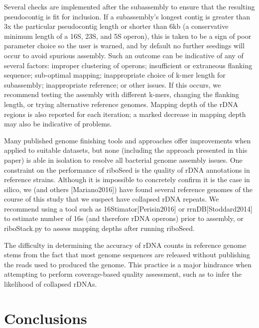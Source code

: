 \documentclass[11pt]{article}
\begin{document}
\begin{linenumbers}
Several checks are implemented after the subassembly to ensure that the resulting pseudocontig is fit for inclusion. If a subassembly’s longest contig is greater than 3x the particular pseudocontig length or shorter than 6kb (a conservative minimum length of a 16S, 23S, and 5S operon), this is taken to be a sign of poor parameter choice so the user is warned, and by default no further seedings will occur to avoid spurious assembly. Such an outcome can be indicative of any of several factors: improper clustering of operons; insufficient or extraneous flanking sequence; sub-optimal mapping; inappropriate choice of k-mer length for subassembly; inappropriate reference; or other issues. If this occurs, we recommend testing the assembly with different k-mers, changing the flanking length, or trying alternative reference genomes. Mapping depth of the rDNA regions is also reported for each iteration; a marked decrease in mapping depth may also be indicative of problems.


Many published genome finishing tools and approaches offer improvements when applied to suitable datasets, but none (including the approach presented in this paper) is able in isolation to resolve all bacterial genome assembly issues. One constraint on the performance of riboSeed is the quality of rDNA annotations in reference strains. Although it is impossible to concretely confirm it is the case in silico, we (and others [Mariano2016]) have found several reference genomes of the course of this study that we suspect have collapsed rDNA repeats. We recommend using a tool such as 16Stimator[Perisin2016] or rrnDB[Stoddard2014] to estimate number of 16s (and therefore rDNA operons) prior to assembly, or riboStack.py to assess mapping depths after running riboSeed.


The difficulty in determining the accuracy of rDNA counts in reference genome stems from the fact that most genome sequences are released without publishing the reads used to produced the genome. This practice is a major hindrance when attempting to perform coverage-based quality assessment, such as to infer the likelihood of collapsed rDNAs.




\section*{Conclusions}



\end{linenumbers}
\end{document}
